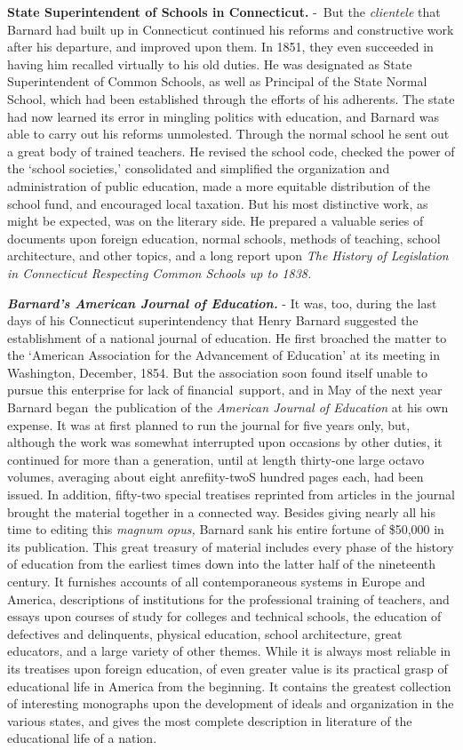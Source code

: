 \documentclass[]{book}
\begin{document}
\textbf{State Superintendent of Schools in Connecticut.} -~But the \emph{clientele} that Barnard had built up in Connecticut continued his reforms and constructive work after his departure, and improved upon them. In 1851, they even succeeded in having him recalled virtually to his old duties. He was designated as State Superintendent of Common Schools, as well as Principal of the State Normal School, which had been established through the efforts of his adherents. The state had now learned its error in mingling politics with education, and Barnard was able to carry out his reforms unmolested. Through the normal school he sent out a great body of trained teachers. He revised the school code, checked the power of the `school societies,' consolidated and simplified the organization and administration of public education, made a more equitable distribution of the school fund, and encouraged local taxation. But his most distinctive work, as might be expected, was on the literary side. He prepared a valuable series of documents upon foreign education, normal schools, methods of teaching, school architecture, and other topics, and a long report upon \emph{The History of Legislation in Connecticut Respecting Common Schools up to 1838.}

\textbf{\emph{Barnard's American Journal of Education.}} - It was, too, during the last days of his Connecticut superintendency that Henry Barnard suggested the establishment of a national journal of education. He first broached the matter to the `American Association for the Advancement of Education' at its meeting in Washington, December, 1854. But the association soon found itself unable to pursue this enterprise for lack of financial~support, and in May of the next year Barnard began~the publication of the \emph{American Journal of Education} at his own expense. It was at first planned to run the journal for five years only, but, although the work was somewhat interrupted upon occasions by other duties, it continued for more than a generation, until at length thirty-one large octavo volumes, averaging about eight anr\textbar{}efiity-twoS hundred pages each, had been issued. In addition, fifty-two special treatises reprinted from articles in the journal brought the material together in a connected way. Besides giving nearly all his time to editing this \emph{magnum opus,} Barnard sank his entire fortune of \$50,000 in its publication. This great treasury of material includes every phase of the history of education from the earliest times down into the latter half of the nineteenth century. It furnishes accounts of all contemporaneous systems in Europe and America, descriptions of institutions for the professional training of teachers, and essays upon courses of study for colleges and technical schools, the education of defectives and delinquents, physical education, school architecture, great educators, and a large variety of other themes. While it is always most reliable in its treatises upon foreign education, of even greater value is its practical grasp of educational life in America from the beginning. It contains the greatest collection of interesting monographs upon the development of ideals and organization in the various states, and gives the most complete description in literature of the educational life of a nation.
\end{document}
